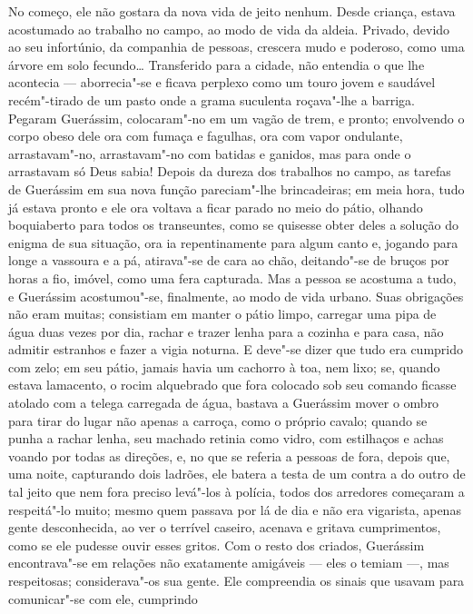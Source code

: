 No começo, ele não gostara da nova vida de jeito nenhum. Desde criança,
estava acostumado ao trabalho no campo, ao modo de vida da aldeia.
Privado, devido ao seu infortúnio, da companhia de pessoas, crescera
mudo e poderoso, como uma árvore em solo fecundo\ldots{} Transferido para a
cidade, não entendia o que lhe acontecia --- aborrecia"-se e ficava
perplexo como um touro jovem e saudável recém"-tirado de um pasto onde a
grama suculenta roçava"-lhe a barriga. Pegaram Guerássim, colocaram"-no em
um vagão de trem, e pronto; envolvendo o corpo obeso dele ora com fumaça
e fagulhas, ora com vapor ondulante, arrastavam"-no, arrastavam"-no com
batidas e ganidos, mas para onde o arrastavam só Deus sabia! Depois da
dureza dos trabalhos no campo, as tarefas de Guerássim em sua nova
função pareciam"-lhe brincadeiras; em meia hora, tudo já estava pronto e
ele ora voltava a ficar parado no meio do pátio, olhando boquiaberto
para todos os transeuntes, como se quisesse obter deles a solução do
enigma de sua situação, ora ia repentinamente para algum canto e,
jogando para longe a vassoura e a pá, atirava"-se de cara ao chão,
deitando"-se de bruços por horas a fio, imóvel, como uma fera capturada.
Mas a pessoa se acostuma a tudo, e Guerássim acostumou"-se, finalmente,
ao modo de vida urbano. Suas obrigações não eram muitas; consistiam em
manter o pátio limpo, carregar uma pipa de água duas vezes por dia,
rachar e trazer lenha para a cozinha e para casa, não admitir estranhos
e fazer a vigia noturna. E deve"-se dizer que tudo era cumprido com zelo;
em seu pátio, jamais havia um cachorro à toa, nem lixo; se, quando
estava lamacento, o rocim alquebrado que fora colocado sob seu comando
ficasse atolado com a telega carregada de água, bastava a Guerássim
mover o ombro para tirar do lugar não apenas a carroça, como o próprio
cavalo; quando se punha a rachar lenha, seu machado retinia como vidro,
com estilhaços e achas voando por todas as direções, e, no que se
referia a pessoas de fora, depois que, uma noite, capturando dois
ladrões, ele batera a testa de um contra a do outro de tal jeito que nem
fora preciso levá"-los à polícia, todos dos arredores começaram a
respeitá"-lo muito; mesmo quem passava por lá de dia e não era vigarista,
apenas gente desconhecida, ao ver o terrível caseiro, acenava e gritava
cumprimentos, como se ele pudesse ouvir esses gritos. Com o resto dos
criados, Guerássim encontrava"-se em relações não exatamente amigáveis
--- eles o temiam ---, mas respeitosas; considerava"-os sua gente. Ele
compreendia os sinais que usavam para comunicar"-se com ele, cumprindo
